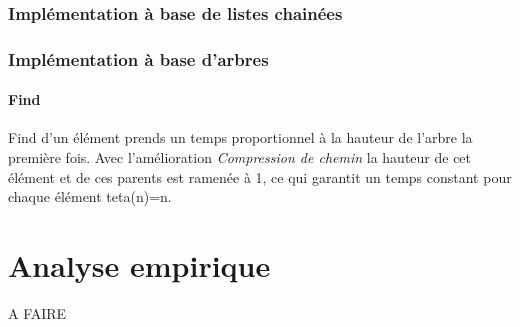 \documentclass[11pt]{article}
\begin{document}
		\subsubsection{Implémentation à base de listes chainées}
		\subsubsection{Implémentation à base d'arbres}
			\paragraph{Find}		
		Find d'un élément prends un temps proportionnel à la hauteur de l'arbre la première fois. Avec l'amélioration \textit{Compression de chemin} la hauteur de cet élément et de ces parents est ramenée à 1, ce qui garantit un temps constant pour chaque élément teta(n)=n.

\section{Analyse empirique}

A FAIRE
\end{document}
